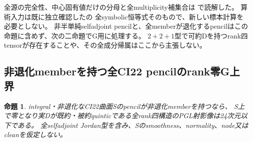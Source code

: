 \documentclass[a4paper,11pt]{ltjsarticle}
\newtheorem{proposition}{命題}[section]
\theoremstyle{definition}
\begin{document}
全源の完全性、中心固有値だけの分母と全multiplicity補集合は
で読解した。
算術入力は既に独立確認したの
全symbolic恒等式そのもので、新しい標本計算を必要としない。
非半単純selfadjoint pencilと、全memberが退化するpencilはこの命題に含めず、次の二命題でG用に処理する。
$2+2+1$型で可約Dを持つrank四tensorが存在することや、その全成分帰属はここから主張しない。

\subsection{非退化memberを持つ全CI22 pencilのrank零G上界}
\begin{proposition}\label{prop:regular-CI22-rank-zero-G}
integral・非退化なCI22曲面Sのpencilが非退化memberを持つなら、
S上で零となり実Dが既約・被約quinticである全rank四構造のPGL射影像は24次元以下である。
全selfadjoint Jordan型を含み、Sのsmoothness、normality、node又はcleanを仮定しない。
\end{proposition}
\end{document}
